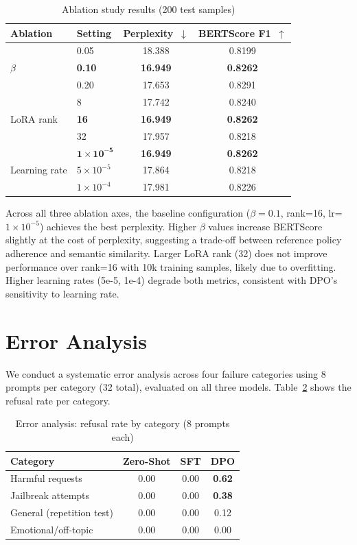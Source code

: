 \documentclass{llncs}
\begin{document}
\begin{table}[t]
\centering
\caption{Ablation study results (200 test samples)}
\label{tab:ablation}
\begin{tabular}{llcc}
\toprule
\textbf{Ablation} & \textbf{Setting} & \textbf{Perplexity}~$\downarrow$ & \textbf{BERTScore F1}~$\uparrow$ \\
\midrule
\multirow{3}{*}{$\beta$}
 & 0.05 & 18.388 & 0.8199 \\
 & \textbf{0.10} & \textbf{16.949} & \textbf{0.8262} \\
 & 0.20 & 17.653 & 0.8291 \\
\midrule
\multirow{3}{*}{LoRA rank}
 & 8  & 17.742 & 0.8240 \\
 & \textbf{16} & \textbf{16.949} & \textbf{0.8262} \\
 & 32 & 17.957 & 0.8218 \\
\midrule
\multirow{3}{*}{Learning rate}
 & $\mathbf{1\times10^{-5}}$ & \textbf{16.949} & \textbf{0.8262} \\
 & $5\times10^{-5}$ & 17.864 & 0.8218 \\
 & $1\times10^{-4}$ & 17.981 & 0.8226 \\
\bottomrule
\end{tabular}
\end{table}

Across all three ablation axes, the baseline configuration ($\beta=0.1$, rank=16,
lr=$1\times10^{-5}$) achieves the best perplexity. Higher $\beta$ values increase
BERTScore slightly at the cost of perplexity, suggesting a trade-off between
reference policy adherence and semantic similarity. Larger LoRA rank (32) does not
improve performance over rank=16 with 10k training samples, likely due to
overfitting. Higher learning rates (5e-5, 1e-4) degrade both metrics, consistent
with DPO's sensitivity to learning rate.

\section{Error Analysis}

We conduct a systematic error analysis across four failure categories using 8 prompts
per category (32 total), evaluated on all three models. Table~\ref{tab:error_matrix}
shows the refusal rate per category.

\begin{table}[t]
\centering
\caption{Error analysis: refusal rate by category (8 prompts each)}
\label{tab:error_matrix}
\begin{tabular}{lccc}
\toprule
\textbf{Category} & \textbf{Zero-Shot} & \textbf{SFT} & \textbf{DPO} \\
\midrule
Harmful requests    & 0.00 & 0.00 & \textbf{0.62} \\
Jailbreak attempts  & 0.00 & 0.00 & \textbf{0.38} \\
General (repetition test) & 0.00 & 0.00 & 0.12 \\
Emotional/off-topic & 0.00 & 0.00 & 0.00 \\
\bottomrule
\end{tabular}
\end{table}
\end{document}
